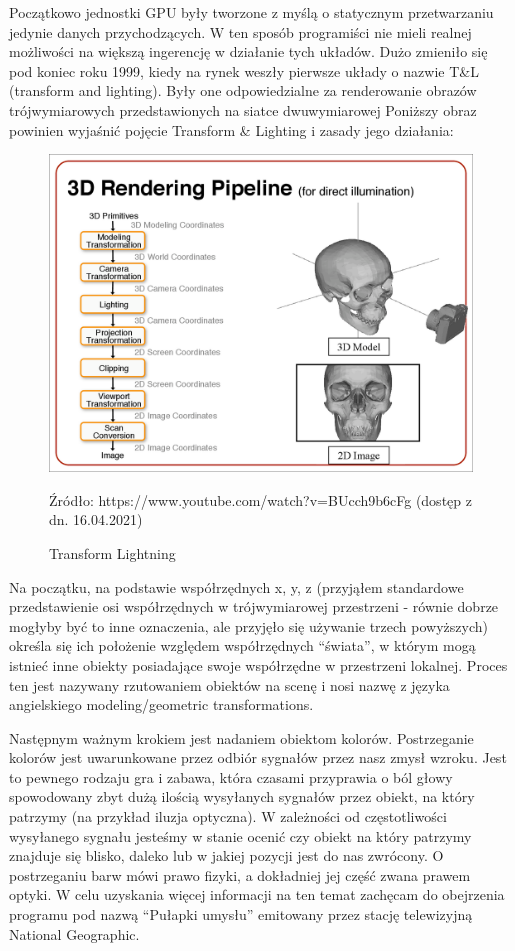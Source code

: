 \documentclass{article}
\begin{document}
	\par
	Początkowo jednostki GPU były tworzone z myślą o statycznym przetwarzaniu jedynie danych przychodzących. W ten sposób programiści nie mieli realnej możliwości na większą ingerencję w działanie tych układów. Dużo zmieniło się pod koniec roku 1999, kiedy na rynek weszły pierwsze układy o nazwie T&L (transform and lighting)\cite{ref13}. Były one odpowiedzialne za renderowanie obrazów trójwymiarowych przedstawionych na siatce dwuwymiarowej Poniższy obraz powinien wyjaśnić pojęcie Transform & Lighting i zasady jego działania:
	\begin{figure}
		\centering
		\includegraphics[width=15cm]{tandl}
		\caption{Transform Lightning}
		Źródło: https://www.youtube.com/watch?v=BUcch9b6cFg (dostęp z dn. 16.04.2021)
	\end{figure}
	\par
	Na początku, na podstawie współrzędnych x, y, z (przyjąłem standardowe przedstawienie osi współrzędnych w trójwymiarowej przestrzeni - równie dobrze mogłyby być to inne oznaczenia, ale przyjęło się używanie trzech powyższych) określa się ich położenie względem współrzędnych “świata”, w którym mogą istnieć inne obiekty posiadające swoje współrzędne w przestrzeni lokalnej. Proces ten jest nazywany rzutowaniem obiektów na scenę i nosi nazwę z języka angielskiego modeling/geometric transformations.
	\par
	Następnym ważnym krokiem jest nadaniem obiektom kolorów. Postrzeganie kolorów jest uwarunkowane przez odbiór sygnałów przez nasz zmysł wzroku. Jest to pewnego rodzaju gra i zabawa, która czasami przyprawia o ból głowy spowodowany zbyt dużą ilością \linebreak wysyłanych sygnałów przez obiekt, na który patrzymy (na przykład iluzja optyczna). W zależności od częstotliwości wysyłanego sygnału jesteśmy w stanie ocenić czy obiekt na który patrzymy znajduje się blisko, daleko lub w jakiej pozycji jest do nas zwrócony. O postrzeganiu barw mówi prawo fizyki, a dokładniej jej część zwana prawem optyki. W celu uzyskania więcej informacji na ten temat zachęcam do obejrzenia programu pod nazwą “Pułapki umysłu” emitowany przez stację telewizyjną National Geographic.
\end{document}
